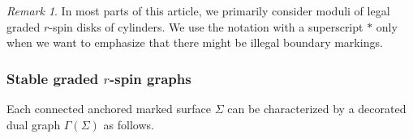 \documentclass[11pt]{amsart}
\theoremstyle{definition}
\theoremstyle{remark}
\newtheorem{rmk}[dummy]{Remark}
\newcommand{\<}{\left<}
\renewcommand{\>}{\right>}
\numberwithin{equation}{section}
\begin{document}
\begin{rmk}
   In most parts of this article, we primarily consider moduli of legal graded $r$-spin disks of cylinders. We use the notation with a %
superscript $*$ only %
when we want to emphasize that there might be illegal boundary markings. 
\end{rmk}




\subsubsection{Stable graded $r$-spin graphs}
Each connected anchored marked surface $\Sigma$ can be characterized by a decorated dual graph $\Gamma(\Sigma)$ %
as follows.
\end{document}
